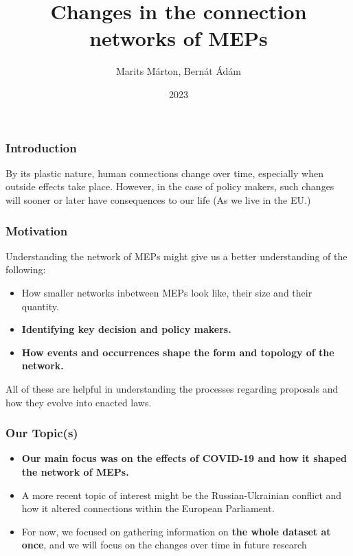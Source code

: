 \documentclass{beamer}
\title{Changes in the connection networks of MEPs}
\author[Marits Márton, Bernát Ádám]{Marits Márton, Bernát Ádám}
\institute[BME]
{ Budapesti Műszaki és Gazdaságtudományi Egyetem \\
					\textbf{Project Laboratory}								}
\date{2023}
\begin{document}
\begin{frame}
\titlepage
\end{frame}

\begin{frame}
\frametitle{Introduction}
By its plastic nature, human connections change over time, especially when outside effects take place. However, in the case of policy makers, such changes will sooner or later have consequences to our life (As we live in the EU.)
\end{frame}


\begin{frame}
\frametitle{Motivation}

Understanding the network of MEPs might give us a better understanding of the following:

\bigskip

\begin{itemize}
	\pause \item How smaller networks inbetween MEPs look like, their size and their quantity.
	
	\pause \item \textbf{Identifying key decision and policy makers.}
	
	\pause \item \textbf{How events and occurrences shape the form and topology of the network.}

\end{itemize}

\pause All of these are helpful in understanding the processes regarding proposals and how they evolve into enacted laws.

\end{frame}



\begin{frame}
\frametitle{Our Topic(s)}

\bigskip

\begin{itemize}
	\pause \item \textbf{Our main focus was on the effects of COVID-19 and how it shaped the network of MEPs.}
	
	\pause \item A more recent topic of interest might be the Russian-Ukrainian conflict and how it altered connections within the European Parliament.
	
	\pause \item For now, we focused on gathering information on \textbf{the whole dataset at once}, and we will focus on the changes over time in future research

\end{itemize}
\end{frame}
\end{document}
